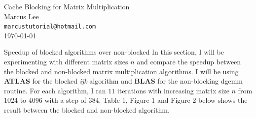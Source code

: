 \documentclass[12pt]{article}
\begin{document}
\begin{center}
    {\LARGE Cache Blocking for Matrix Multiplication} \\[0.6cm]

    Marcus Lee \\
    \texttt{\small marcustutorial@hotmail.com} \\[0.3cm]

    \small \today
\end{center}

\begin{section}{Speedup of blocked algorithms over non-blocked}
 In this section, I will be experimenting with different matrix sizes $n$ and compare the speedup between the blocked and non-blocked matrix multiplication algorithms.
 I will be using \textbf{ATLAS} for the blocked \textit{ijk} algorithm and \textbf{BLAS} for the non-blocking dgemm routine. For each algorithm, I ran $11$ iterations
 with increasing matrix size $n$ from $1024$ to $4096$ with a step of $384$. Table 1, Figure 1 and Figure 2 below shows the result between the blocked and non-blocked algorithm.


\end{section}
\end{document}
